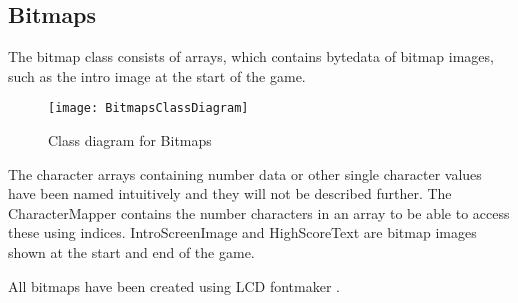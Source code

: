 \subsection{Bitmaps}
	The bitmap class consists of arrays, which contains bytedata of bitmap images, such as the intro image at the start of the game. 
	
	\begin{figure}[H]
		\texttt{[image: BitmapsClassDiagram]}
		\centering
		\caption{Class diagram for Bitmaps}
		\label{fig:classBitmap}
	\end{figure}
	
	The character arrays containing number data or other single character values have been named intuitively and they will not be described further. The CharacterMapper contains the number characters in an array to be able to access these using indices. IntroScreenImage and HighScoreText are bitmap images shown at the start and end of the game.
	
	All bitmaps have been created using LCD fontmaker \cite{FontMaker}. 